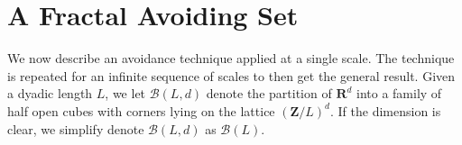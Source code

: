 \documentclass{article}
\theoremstyle{plain}
\theoremstyle{plain}
\begin{document}


\section{A Fractal Avoiding Set}

We now describe an avoidance technique applied at a single scale. The technique is repeated for an infinite sequence of scales to then get the general result. Given a dyadic length $L$, we let $\mathcal{B}(L,d)$ denote the partition of $\mathbf{R}^d$ into a family of half open cubes with corners lying on the lattice $(\mathbf{Z}/L)^d$. If the dimension is clear, we simplify denote $\mathcal{B}(L,d)$ as $\mathcal{B}(L)$.
\end{document}
